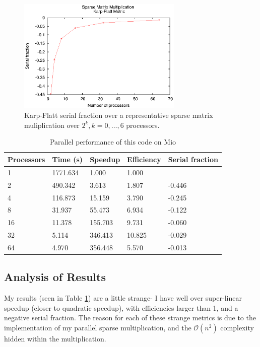 \documentclass{article}
\begin{document}
\begin{figure}
\centering
\includegraphics[width=0.7\textwidth]{karp_plot_3000.eps}
\caption{\label{karp} Karp-Flatt serial fraction over a representative sparse
matrix muliplication over $2^k, k=0,\ldots,6$ processors.}
\end{figure}

\begin{table}[h]
    \centering
\begin{tabular}{|l|l|l|l|l|} \hline
    Processors & Time (s) & Speedup & Efficiency & Serial fraction \\ \hline
\hline    1          & 1771.634 & 1.000   & 1.000      &                 \\
    2          & 490.342  & 3.613   & 1.807      & -0.446          \\
    4          & 116.873  & 15.159  & 3.790      & -0.245          \\
    8          & 31.937   & 55.473  & 6.934      & -0.122          \\
    16         & 11.378   & 155.703 & 9.731      & -0.060          \\
    32         & 5.114    & 346.413 & 10.825     & -0.029          \\
    64         & 4.970    & 356.448 & 5.570      & -0.013         \\ \hline
\end{tabular}
\caption{Parallel performance of this code on Mio \label{table}}
\end{table}

\subsection{Analysis of Results}
My results (seen in Table \ref{table}) are a little strange- I have well over super-linear speedup (closer
to quadratic speedup), with efficiencies larger than 1, and a negative serial
fraction. The reason for each of these strange metrics is due to the
implementation of my parallel sparse multiplication, and the $\mathcal{O}(n^2)$
complexity hidden within the multiplication. \\
\end{document}
